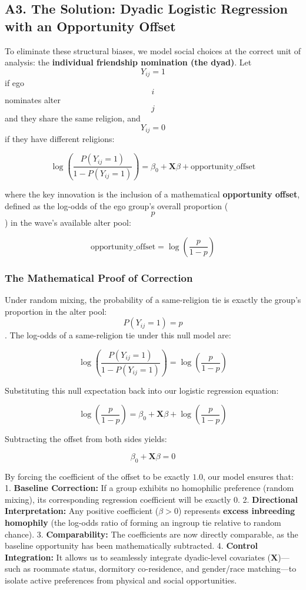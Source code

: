 \documentclass[
  letterpaper,
  DIV=11,
  numbers=noendperiod]{scrartcl}
\begin{document}
\subsection{A3. The Solution: Dyadic Logistic Regression with an
Opportunity
Offset}\label{a3.-the-solution-dyadic-logistic-regression-with-an-opportunity-offset}

To eliminate these structural biases, we model social choices at the
correct unit of analysis: the \textbf{individual friendship nomination
(the dyad)}. Let \[Y_{ij} = 1\] if ego \[i\] nominates alter \[j\] and
they share the same religion, and \[Y_{ij} = 0\] if they have different
religions:

\[\log\left(\frac{P(Y_{ij} = 1)}{1 - P(Y_{ij} = 1)}\right) = \beta_0 + \mathbf{X}\beta + \text{opportunity\_offset}\]

where the key innovation is the inclusion of a mathematical
\textbf{opportunity offset}, defined as the log-odds of the ego group's
overall proportion (\[p\]) in the wave's available alter pool:

\[\text{opportunity\_offset} = \log\left(\frac{p}{1 - p}\right)\]

\subsubsection{The Mathematical Proof of
Correction}\label{the-mathematical-proof-of-correction}

Under random mixing, the probability of a same-religion tie is exactly
the group's proportion in the alter pool: \[P(Y_{ij} = 1) = p\]. The
log-odds of a same-religion tie under this null model are:

\[\log\left(\frac{P(Y_{ij} = 1)}{1 - P(Y_{ij} = 1)}\right) = \log\left(\frac{p}{1 - p}\right)\]

Substituting this null expectation back into our logistic regression
equation:

\[\log\left(\frac{p}{1 - p}\right) = \beta_0 + \mathbf{X}\beta + \log\left(\frac{p}{1 - p}\right)\]

Subtracting the offset from both sides yields:

\[\beta_0 + \mathbf{X}\beta = 0\]

By forcing the coefficient of the offset to be exactly \(1.0\), our
model ensures that: 1. \textbf{Baseline Correction:} If a group exhibits
no homophilic preference (random mixing), its corresponding regression
coefficient will be exactly \(0\). 2. \textbf{Directional
Interpretation:} Any positive coefficient (\(\beta > 0\)) represents
\textbf{excess inbreeding homophily} (the log-odds ratio of forming an
ingroup tie relative to random chance). 3. \textbf{Comparability:} The
coefficients are now directly comparable, as the baseline opportunity
has been mathematically subtracted. 4. \textbf{Control Integration:} It
allows us to seamlessly integrate dyadic-level covariates
(\(\mathbf{X}\))---such as roommate status, dormitory co-residence, and
gender/race matching---to isolate active preferences from physical and
social opportunities.
\end{document}
